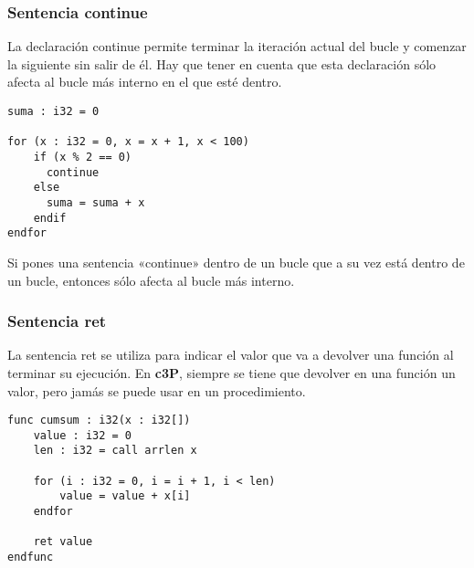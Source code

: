 \subsubsection{Sentencia continue}

La declaración continue permite terminar la iteración actual del bucle y
comenzar la siguiente sin salir de él. Hay que tener en cuenta que esta
declaración sólo afecta al bucle más interno en el que esté dentro.

\begin{verbatim}
suma : i32 = 0

for (x : i32 = 0, x = x + 1, x < 100)
    if (x % 2 == 0)
      continue
    else
      suma = suma + x
    endif
endfor
\end{verbatim}

Si pones una sentencia «continue» dentro de un bucle que a su vez está dentro de un bucle, entonces sólo afecta al bucle más interno.

\subsubsection{Sentencia ret}

La sentencia ret se utiliza para indicar el valor que va a devolver una función al
terminar su ejecución. En \textbf{c3P}, siempre se tiene que devolver en una
función un valor, pero jamás se puede usar en un procedimiento.

\begin{verbatim}
func cumsum : i32(x : i32[])
    value : i32 = 0
    len : i32 = call arrlen x

    for (i : i32 = 0, i = i + 1, i < len)
        value = value + x[i]
    endfor

    ret value
endfunc
\end{verbatim}

